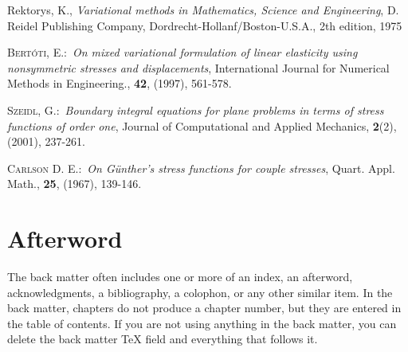 \documentclass[letterpaper,12pt,openany,reqno]{book}%
\begin{document}
\begin{thebibliography}{9}
Rektorys, K., \textit{Variational methods in Mathematics,
Science and Engineering}, D. Reidel Publishing Company,
Dordrecht-Hollanf/Boston-U.S.A., 2th edition, 1975

 \textsc{Bert\'{o}ti, E.}:\ \textit{On mixed variational formulation
of linear elasticity using nonsymmetric stresses and displacements}, International
Journal for Numerical Methods in Engineering., \textbf{42}, (1997), 561-578.

 \textsc{Szeidl, G.}:\ \textit{Boundary integral equations for
plane problems in terms of stress functions of order one}, Journal of Computational and
Applied Mechanics, \textbf{2}(2), (2001), 237-261.

  \textsc{Carlson D. E.}:\ \textit{On G\"{u}nther's stress functions
for couple stresses}, Quart. Appl. Math., \textbf{25}, (1967), 139-146.
\end{thebibliography}

\backmatter

\chapter{Afterword}

The back matter often includes one or more of an index, an afterword,
acknowledgments, a bibliography, a colophon, or any other similar item. In
the back matter, chapters do not produce a chapter number, but they are
entered in the table of contents. If you are not using anything in the back
matter, you can delete the back matter TeX field and everything that follows it.
\end{document}
